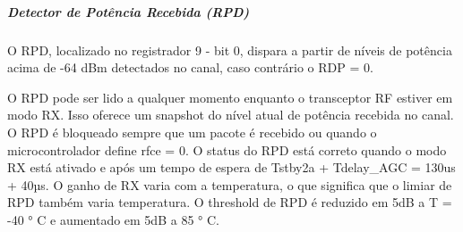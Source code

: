 \subparagraph{Detector de Potência Recebida (RPD)}
O RPD, localizado no registrador 9 - bit 0, dispara a partir de níveis de potência acima de -64 dBm detectados no canal, caso contrário o RDP = 0.

O RPD pode ser lido a qualquer momento enquanto o transceptor RF estiver em modo RX. Isso oferece um snapshot do nível atual de potência recebida no canal. O RPD é bloqueado sempre que um pacote é recebido ou
quando o microcontrolador define rfce = 0. O status do RPD está correto quando o modo RX está ativado e após um tempo de espera de Tstby2a + Tdelay_AGC = 130us + 40µs. O ganho de RX varia com a temperatura, o que significa que o limiar de RPD também varia temperatura. O threshold de RPD é reduzido em 5dB a T = -40 ° C e aumentado em 5dB a 85 ° C.